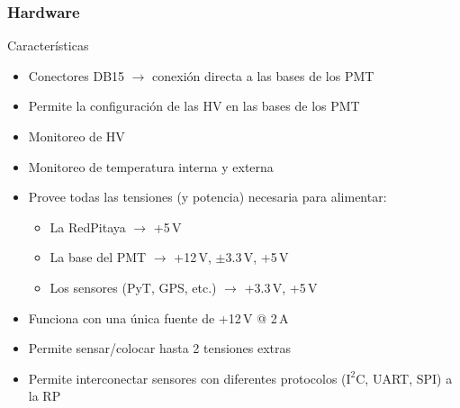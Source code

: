 \documentclass{beamer}
\begin{document}
\begin{frame}
\begin{columns}
\begin{column}{0.5\textwidth}
								\end{column}
				\end{columns}
\end{frame}

\begin{frame}
				\frametitle{Hardware}
				\begin{exampleblock}{Características}
								\begin{itemize}
												\item Conectores DB15 $\to$ conexión directa a las bases de los PMT
												\item Permite la configuración de las HV en las bases de los PMT
												\item Monitoreo de HV
												\item Monitoreo de temperatura interna y externa
												\item Provee todas las tensiones (y potencia) necesaria para alimentar:
																\begin{itemize}
																				\item La RedPitaya $\to$ \alert{+5\,V}
																				\item La base del PMT $\to$ \alert{+12\,V, $\pm$3.3\,V,
																								+5\,V}
																				\item Los sensores (PyT, GPS, etc.) $\to$
																								\alert{+3.3\,V, +5\,V}
																\end{itemize}
												\item Funciona con una única fuente de +12\,V @ 2\,A
												\item Permite sensar/colocar hasta 2 tensiones extras
												\item Permite interconectar sensores con diferentes
																protocolos ($\text{I}^2$C,
																UART, SPI) a la RP
								\end{itemize}
				\end{exampleblock}
\end{frame}
\end{document}
